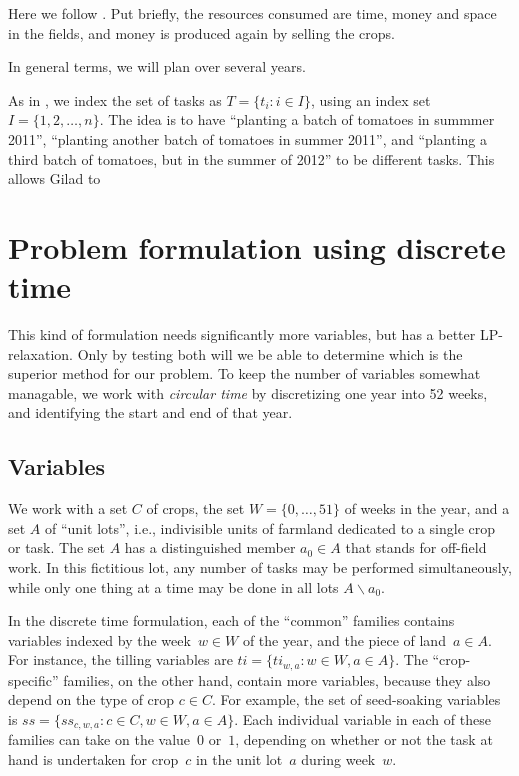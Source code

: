 \documentclass[11pt]{amsart}
\numberwithin{equation}{section}
\begin{document}
Here we follow \cite{artigues-etal11}. Put briefly, the resources
consumed are time, money and space in the fields, and money is
produced again by selling the crops.

In general terms, we will plan over several years.

As in \cite{artigues-etal11}, we index the set of tasks as
$T=\{t_i:i\in I\}$, using an index set $I=\{1,2,\dots,n\}$. The idea
is to have ``planting a batch of tomatoes in summmer 2011'',
``planting another batch of tomatoes in summer 2011'', and ``planting
a third batch of tomatoes, but in the summer of 2012'' to be different
tasks. This allows Gilad to 

\section{Problem formulation using discrete time}

This kind of formulation needs significantly more variables, but has a
better LP-relaxation. Only by testing both will we be able to
determine which is the superior method for our problem. To keep the
number of variables somewhat managable, we work with \emph{circular time} by
discretizing one year into 52 weeks, and identifying the start and end
of that year.
  
\subsection{Variables}

We work with a set $C$ of crops, the set $W=\{0,\dots,51\}$ of weeks
in the year, and a set $A$ of ``unit lots'', i.e., indivisible units
of farmland dedicated to a single crop or task. The set $A$ has a
distinguished member $a_0\in A$ that stands for off-field work. In
this fictitious lot, any number of tasks may be performed
simultaneously, while only one thing at a time may be done in all lots
$A\smallsetminus a_0$.

In the discrete time formulation, each of the ``common'' families
contains variables indexed by the week~$w\in W$ of the year, and the
piece of land~$a\in A$. For instance, the tilling variables are
$ti=\{ti_{w,a}:w\in W, a\in A\}$. The ``crop-specific'' families, on
the other hand, contain more variables, because they also depend on
the type of crop $c\in C$. For example, the set of seed-soaking
variables is $ss=\{ss_{c,w,a} : c\in C, w\in W, a\in A\}$. Each
individual variable in each of these families can take on the
value~$0$ or~$1$, depending on whether or not the task at hand is
undertaken for crop~$c$ in the unit lot~$a$ during week~$w$.
\end{document}
